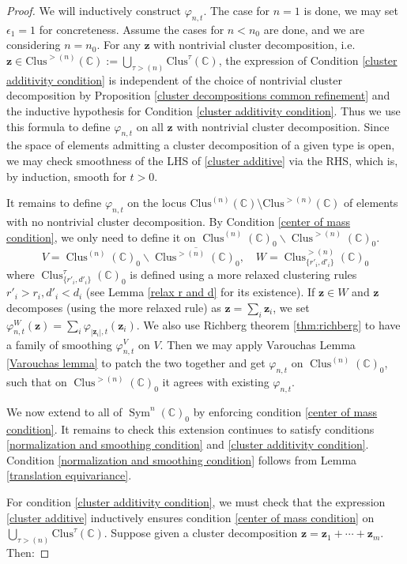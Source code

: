 \documentclass{article}
\def\C{\mathbb{C}}
\def\RM{\backslash}
\DeclareMathOperator{\Sym}{Sym}
\DeclareMathOperator{\Clus}{Clus}
\def\bz{\mathbf{z}} %
\theoremstyle{definition}
\begin{document}
\begin{proof}

We will inductively construct $\varphi_{n,t}$. The case for $n=1$ is done, we may set $\epsilon_1=1$ for concreteness. Assume the cases for $n<n_0$ are done, and we are considering $n=n_0$.  For any $\mathbf{z}$ with nontrivial cluster decomposition, i.e. $\mathbf{z} \in \mathrm{Clus}^{>(n)}(\C) := \bigcup_{\tau > (n)} \mathrm{Clus}^\tau(\C)$, the expression of 
Condition \eqref{cluster additivity condition} is independent of the choice of nontrivial cluster decomposition by Proposition \ref{cluster decompositions common refinement} and the inductive hypothesis for Condition \eqref{cluster additivity condition}. 
Thus we use this formula to define $\varphi_{n, t}$ on all $\mathbf{z}$ with nontrivial cluster decomposition.  Since the space of elements admitting a cluster decomposition of a given type is open, we may check smoothness of the LHS of \eqref{cluster additive} via the RHS, which is, by induction, smooth for  $t > 0$. 

It remains to define $\varphi_{n, t}$ on the locus $\mathrm{Clus}^{(n)}(\C) \setminus  \mathrm{Clus}^{>(n)}(\C)$ of elements with no nontrivial cluster decomposition. By Condition \ref{center of mass condition}, we only need to define it on $\Clus^{(n)}(\C)_0 \RM \Clus^{>(n)}(\C)_0$.  
$$V = \Clus^{(n)}(\C)_0 \RM \overline{\Clus^{>(n)}(\C)_0},\quad W = \Clus^{>(n)}_{\{r'_i, d'_i\}}(\C)_0 $$
where $\Clus^{\tau}_{\{r'_i, d'_i\}}(\C)_0$ is defined using a more relaxed clustering rules $r'_i > r_i, d'_i < d_i$ (see Lemma \ref{relax r and d} for its existence). If $\bz \in W$ and $\bz$ decomposes (using the more relaxed rule) as $\bz = \sum_i \bz_i$, we set $\varphi_{n,t}^W(\bz) = \sum_i \varphi_{|\bz_i|,t}(\bz_i)$. We also use Richberg theorem \ref{thm:richberg} to have a family of smoothing $\varphi^V_{n,t}$ on $V$. Then we may apply Varouchas Lemma \ref{Varouchas lemma} to patch the two together and get $\varphi_{n,t}$ on $\Clus^{(n)}(\C)_0$, such that on $\Clus^{>(n)}(\C)_0$ it agrees with existing $\varphi_{n,t}$. 



We now extend  to all of $\Sym^n(\C)_0$ by enforcing condition \eqref{center of mass condition}.  It remains to check this extension continues to satisfy  conditions \eqref{normalization and smoothing condition} and \eqref{cluster additivity condition}.  Condition \eqref{normalization and smoothing condition} follows from 
Lemma \ref{translation equivariance}.  

For condition \eqref{cluster additivity condition}, we must check that the expression \eqref{cluster additive} inductively ensures condition \eqref{center of mass condition} on $\bigcup_{\tau > (n)} \mathrm{Clus}^\tau(\C)$. 
Suppose given a cluster decomposition $\mathbf{z}=\mathbf{z}_1+\cdots+\mathbf{z}_m$.  Then:


\end{proof}
\end{document}
